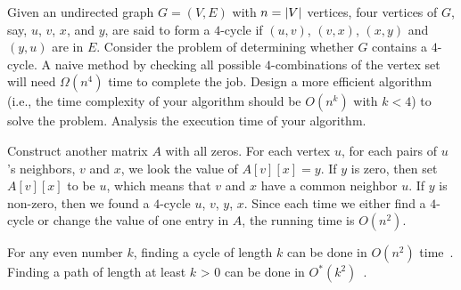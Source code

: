 \begin{Exercise}[origin={NCU CSIE 95}]
Given an undirected graph $G = (V, E)$ with $n = \lvert V\rvert$ vertices, four vertices of $G$, say, $u$, $v$, $x$, and $y$, are said to form a $4$-cycle if $(u, v)$, $(v, x)$, $(x, y)$ and $(y, u)$ are in $E$. Consider the problem of determining whether $G$ contains a $4$-cycle. A naive method by checking all possible $4$-combinations of the vertex set will need $\Omega(n^4)$ time to complete the job. Design a more efficient algorithm (i.e., the time complexity of your algorithm should be $O(n^k)$ with $k < 4$) to solve the problem. Analysis the execution time of your algorithm.
\end{Exercise}
\begin{Answer}
Construct another matrix $A$ with all zeros. For each vertex $u$, for each pairs of $u$'s neighbors, $v$ and $x$, we look the value of $A[v][x] = y$. If $y$ is zero, then set $A[v][x]$ to be $u$, which means that $v$ and $x$ have a common neighbor $u$. If $y$ is non-zero, then we found a $4$-cycle $u$, $v$, $y$, $x$. Since each time we either find a $4$-cycle or change the value of one entry in $A$, the running time is $O(n^2)$.
\begin{remark}
For any even number $k$, finding a cycle of length $k$ can be done in $O(n^2)$ time~\cite{Yuster1997}. Finding a path of length at least $k$ > 0 can be done in $O^*(k^2)$~\cite{Williams2009}.
\end{remark}
\end{Answer}


\printbibliography[heading=subbibliography]
